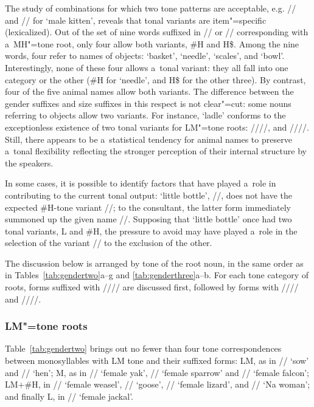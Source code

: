 	The study of combinations for which two tone patterns are acceptable, e.g. // and
	// for ‘male kitten’, reveals that tonal variants are item"=specific
	(lexicalized). Out of the set of nine words suffixed in \mbox{//} or \mbox{//} corresponding
	with a~MH"=tone root, only four allow both variants, \#H and H\$. Among the nine words, four refer to
	names of objects: ‘basket’, ‘needle’, ‘scales’, and ‘bowl’. Interestingly, none of these four allows
	a~tonal {variant}: they all fall into one category or the other (\#H for ‘needle’, and H\$ for the
	other three). By contrast, four of the five animal names allow both variants. The difference between
	the gender suffixes and size suffixes in this respect is not clear"=cut: some nouns
	referring to objects allow two variants. For instance, ‘ladle’ conforms to the exceptionless
	existence of two tonal variants for LM"=tone roots: //{\kern2pt}//, and
	//{\kern2pt}//. Still, there appears to be a~statistical tendency for animal names
	to preserve a~tonal flexibility reflecting the stronger perception of their internal structure by
	the speakers.
	
	In some cases, it is possible to identify factors that have played a~role in contributing to the current tonal output: ‘little bottle’,
	//, does not have the expected \#H-tone {variant} //; to the consultant,
	the latter form immediately summoned up the given name //. Supposing that ‘little
	bottle’ once had two tonal variants, L and \#H, the pressure to avoid  may have played
	a~role in the selection of the variant // to the exclusion of the other.
	
	The discussion below is arranged by tone of the root noun, in the same order as in Tables~\ref{tab:gendertwo}a--g and \ref{tab:genderthree}a--b. For each tone category of roots, forms suffixed with //// are discussed first, followed by forms with //// and ////.
	
	
	\subsubsection{LM"=tone roots}
	\label{sec:lmtoneroots}
	
	
	Table~\ref{tab:gendertwo} brings out no fewer than four tone correspondences between monosyllables with LM tone and their suffixed
	forms: LM, as in // ‘sow’ and // ‘hen’; M, as in // ‘female yak’,
	// ‘female sparrow’ and // ‘female falcon’; LM+\#H, in //
	‘female weasel’, // ‘goose’, // ‘female lizard’, and // ‘Na
	woman’; and finally L, in // ‘female jackal’.
	

